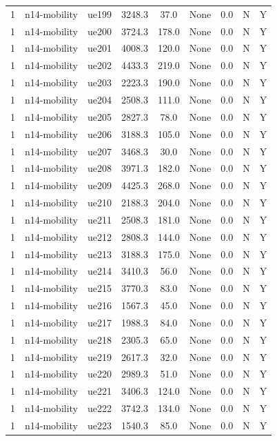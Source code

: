 \begin{table}[ht]
\begin{tabular}{|c|c|c|c|c|c|c|c|c|}
1 & n14-mobility & ue199 & 3248.3 & 37.0 & None & 0.0 & N & Y \\
1 & n14-mobility & ue200 & 3724.3 & 178.0 & None & 0.0 & N & Y \\
1 & n14-mobility & ue201 & 4008.3 & 120.0 & None & 0.0 & N & Y \\
1 & n14-mobility & ue202 & 4433.3 & 219.0 & None & 0.0 & N & Y \\
1 & n14-mobility & ue203 & 2223.3 & 190.0 & None & 0.0 & N & Y \\
1 & n14-mobility & ue204 & 2508.3 & 111.0 & None & 0.0 & N & Y \\
1 & n14-mobility & ue205 & 2827.3 & 78.0 & None & 0.0 & N & Y \\
1 & n14-mobility & ue206 & 3188.3 & 105.0 & None & 0.0 & N & Y \\
1 & n14-mobility & ue207 & 3468.3 & 30.0 & None & 0.0 & N & Y \\
1 & n14-mobility & ue208 & 3971.3 & 182.0 & None & 0.0 & N & Y \\
1 & n14-mobility & ue209 & 4425.3 & 268.0 & None & 0.0 & N & Y \\
1 & n14-mobility & ue210 & 2188.3 & 204.0 & None & 0.0 & N & Y \\
1 & n14-mobility & ue211 & 2508.3 & 181.0 & None & 0.0 & N & Y \\
1 & n14-mobility & ue212 & 2808.3 & 144.0 & None & 0.0 & N & Y \\
1 & n14-mobility & ue213 & 3188.3 & 175.0 & None & 0.0 & N & Y \\
1 & n14-mobility & ue214 & 3410.3 & 56.0 & None & 0.0 & N & Y \\
1 & n14-mobility & ue215 & 3770.3 & 83.0 & None & 0.0 & N & Y \\
1 & n14-mobility & ue216 & 1567.3 & 45.0 & None & 0.0 & N & Y \\
1 & n14-mobility & ue217 & 1988.3 & 84.0 & None & 0.0 & N & Y \\
1 & n14-mobility & ue218 & 2305.3 & 65.0 & None & 0.0 & N & Y \\
1 & n14-mobility & ue219 & 2617.3 & 32.0 & None & 0.0 & N & Y \\
1 & n14-mobility & ue220 & 2989.3 & 51.0 & None & 0.0 & N & Y \\
1 & n14-mobility & ue221 & 3406.3 & 124.0 & None & 0.0 & N & Y \\
1 & n14-mobility & ue222 & 3742.3 & 134.0 & None & 0.0 & N & Y \\
1 & n14-mobility & ue223 & 1540.3 & 85.0 & None & 0.0 & N & Y \\

\end{tabular}
\end{table}
